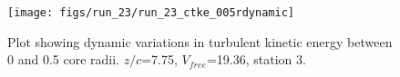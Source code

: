 \begin{figure}[H]
\centering
\texttt{[image: figs/run\_23/run\_23\_ctke\_005rdynamic]}
\caption{Plot showing dynamic variations in turbulent kinetic energy between 0 and 0.5 core radii. $z/c$=7.75, $V_{free}$=19.36, station 3.}
\label{fig:run_23_ctke_005rdynamic}
\end{figure}


